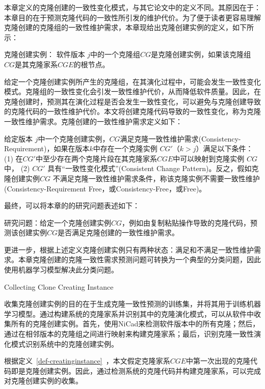 本章定义的克隆创建的一致性变化模式，与其它论文中的定义不同。其原因在于：本章目的在于预测克隆代码的一致性所引发的维护代价。为了便于读者更容易理解克隆创建的克隆组的一致性维护需求，本章现给出克隆创建实例的定义，如下所示：

\begin{definition}[克隆创建实例] 
\label{def-creatinginstance}
克隆创建实例：
软件版本 $j$中的一个克隆组$CG$是克隆创建实例，如果该克隆组$CG$是其克隆家系$CGE$的根节点。
\end{definition}

给定一个克隆创建实例所产生的克隆组，在其演化过程中，可能会发生一致性变化模式。克隆组的一致性变化会引发一致性维护代价，从而降低软件质量。因此，在克隆创建时，预测其在演化过程是否会发生一致性变化，可以避免与克隆创建导致的克隆代码的一致性维护代价。本文将创建克隆代码导致的一致性变化，称为克隆一致性维护需求。克隆创建的一致性维护需求定义如下：

\begin{definition}[创建一致性维护需求] 
 \label{def-creatingrequirement}
给定版本 $j$中一个克隆创建实例，$CG$满足克隆一致性维护需求(Consistency-Requirement)，如果在版本$k$中存在一个克隆实例 $CG'$（$k>j$）满足以下条件： (1) 在$CG'$中至少存在两个克隆片段在其克隆家系$CGE$中可以映射到克隆实例 $CG$中， (2) $CG'$ 具有“一致性变化模式”(Consistent Change Pattern)。反之，假如克隆创建实例$CG$ 不满足克隆一致性维护需求条件，称该克隆实例不需要一致性维护(Consistency-Requirement Free，或Consistency-Free，或Free)。
\end{definition}

最终，可以将本章的的研究问题表述如下：

研究问题：给定一个克隆创建实例$CG$，例如由复制粘贴操作导致的克隆代码，预测该创建实例$CG$是否满足克隆创建的一致性维护需求。

更进一步，根据上述定义克隆创建实例只有两种状态：满足和不满足一致性维护需求。本章克隆创建的克隆一致性需求预测问题可转换为一个典型的分类问题，因此使用机器学习模型解决此分类问题。

{Collecting Clone Creating Instance}
\label{lab-checkcopied}

收集克隆创建实例的目的在于生成克隆一致性预测的训练集，并将其用于训练机器学习模型。通过构建系统的克隆家系并识别其中的克隆演化模式，可以从软件中收集所有的克隆创建实例。首先，使用NiCad来检测软件版本中的所有克隆；然后，通过在相邻版本的克隆组之间进行映射来构建克隆家系；最后，识别克隆一致性演化模式识别系统中的克隆创建实例。

根据定义~\ref{def-creatinginstance}~，本文假定克隆家系$CGE$中第一次出现的克隆代码即是克隆创建实例。因此，通过检测系统的克隆代码并构建克隆家系，可以完成对克隆创建实例的收集。


